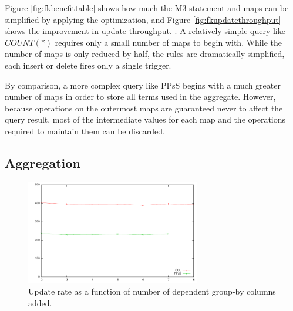 Figure \ref{fig:fkbenefittable} shows how much the M3 statement and maps can be simplified by applying the optimization, and Figure \ref{fig:fkupdatethroughput} shows the improvement in update throughput.  .  A relatively simple query like $COUNT(*)$ requires only a small number of maps to begin with.  While the number of maps is only reduced by half, the rules are dramatically simplified, each insert or delete fires only a single trigger.

By comparison, a more complex query like PPsS begins with a much greater number of maps in order to store all terms used in the aggregate.  However, because operations on the outermost maps are guaranteed never to affect the query result, most of the intermediate values for each map and the operations required to maintain them can be discarded.

\subsection{Aggregation}

\begin{figure}
\begin{center}
\includegraphics[width=3.0in]{images/aggvsupdates.pdf}
\caption{Update rate as a function of number of dependent group-by columns added.}
\label{fig:aggvsupdates}
\end{center}
\end{figure}

